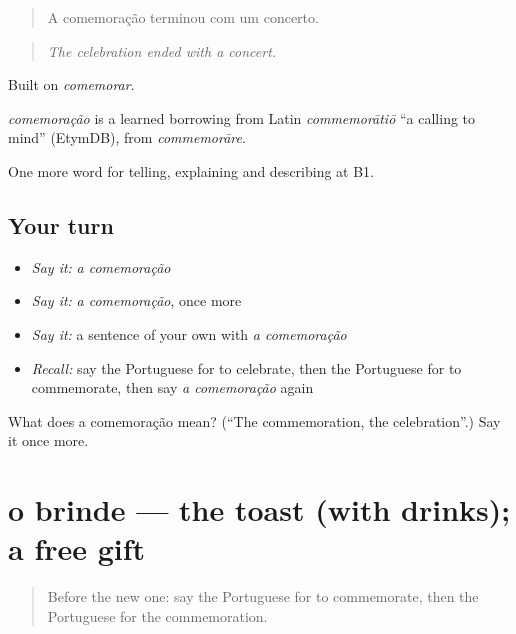 \begin{quote}
A comemoração terminou com um concerto.
\end{quote}

\begin{quote}
\emph{The celebration ended with a concert.}
\end{quote}

Built on \emph{comemorar}.

\begin{cousinweb}
\emph{comemoração} is a learned borrowing from Latin \emph{commemorātiō} \textquotedblleft{}a calling to mind\textquotedblright{} (EtymDB), from \emph{commemorāre}.
\end{cousinweb}

\begin{grammarlens}[title={What you've built}]
One more word for telling, explaining and describing at B1.
\end{grammarlens}

\subsection*{Your turn}
\begin{itemize}
\raggedright
  \item \emph{Say it:} \emph{a comemoração}
  \item \emph{Say it:} \emph{a comemoração}, once more
  \item \emph{Say it:} a sentence of your own with \emph{a comemoração}
  \item \emph{Recall:} say the Portuguese for to celebrate, then the Portuguese for to commemorate, then say \emph{a comemoração} again
\end{itemize}

\begin{tcolorbox}[breakable,colback=teal!4,colframe=teal!35!black,title={Before you move on}]
What does a comemoração mean? (\textquotedblleft{}The commemoration, the celebration\textquotedblright{}.) Say it once more.
\end{tcolorbox}
\section[o brinde]{o brinde — the toast (with drinks); a free gift}

\label{lesson:PT-C318-brinde}



\begin{quote}
Before the new one: say the Portuguese for to commemorate, then the Portuguese for the commemoration.
\end{quote}

